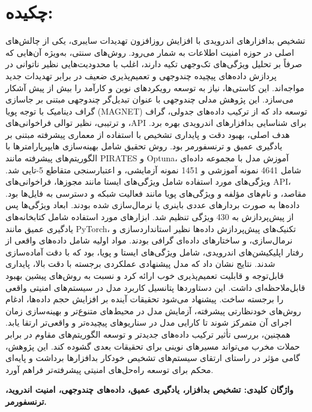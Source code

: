 \chapter*{\vspace{-2.38cm}\fontsize{15}{16}\selectfont چکیده:}
\vspace{-1.5cm}\setlength{\parindent}{20pt}
تشخیص بدافزارهای اندرویدی با افزایش روزافزون تهدیدات سایبری، یکی از چالش‌های اصلی در حوزه امنیت اطلاعات به شمار می‌رود. روش‌های سنتی، به‌ویژه آن‌هایی که صرفاً بر تحلیل ویژگی‌های تک‌وجهی تکیه دارند، اغلب با محدودیت‌هایی نظیر ناتوانی در پردازش داده‌های پیچیده چندوجهی و تعمیم‌پذیری ضعیف در برابر تهدیدات جدید مواجه‌اند. این کاستی‌ها، نیاز به توسعه رویکردهای نوین و کارآمد را بیش از پیش آشکار می‌سازد. این پژوهش مدلی چندوجهی با عنوان تبدیل‌گر چندوجهی مبتنی بر جاسازی گراف دینامیک با توجه پویا (MAGNET) توسعه داد که از ترکیب داده‌های جدولی، گراف و ترتیبی، نظیر توالی فراخوانی‌های ،API برای شناسایی بدافزارهای اندرویدی بهره برد. هدف اصلی، بهبود دقت و پایداری تشخیص با استفاده از معماری پیشرفته مبتنی بر یادگیری عمیق و ترنسفورمر بود. روش تحقیق شامل بهینه‌سازی هایپرپارامترها با الگوریتم‌های پیشرفته مانند PIRATES و Optuna، آموزش مدل با مجموعه داده‌ای شامل 4641 نمونه آموزشی و 1451 نمونه آزمایشی، و اعتبارسنجی متقاطع 5-تایی شد. ویژگی‌های مورد استفاده شامل ویژگی‌های ایستا مانند مجوزها، فراخوانی‌های API، مقاصد، و نام‌های مؤلفه و ویژگی‌های پویا مانند فعالیت شبکه و دسترسی به فایل‌ها بود. داده‌ها به صورت بردارهای عددی باینری یا نرمال‌سازی شده بودند. ابعاد ویژگی‌ها پس از پیش‌پردازش به 430 ویژگی تنظیم شد. ابزارهای مورد استفاده شامل کتابخانه‌های یادگیری عمیق مانند PyTorch، تکنیک‌های پیش‌پردازش داده‌ها نظیر استانداردسازی و نرمال‌سازی، و ساختارهای داده‌ای گرافی بودند. مواد اولیه شامل داده‌های واقعی از رفتار اپلیکیشن‌های اندرویدی، شامل ویژگی‌های ایستا و پویا، بود که با دقت آماده‌سازی شدند. نتایج نشان داد که مدل پیشنهادی عملکردی برجسته با دقت بالا، پایداری قابل‌توجه و قابلیت تعمیم‌پذیری خوب ارائه کرد و نسبت به روش‌های پیشین بهبود قابل‌ملاحظه‌ای داشت. این دستاوردها پتانسیل کاربرد مدل در سیستم‌های امنیتی واقعی را برجسته ساخت. پیشنهاد می‌شود تحقیقات آینده بر افزایش حجم داده‌ها، ادغام روش‌های خودنظارتی پیشرفته، آزمایش مدل در محیط‌های متنوع‌تر و بهینه‌سازی زمان اجرای آن متمرکز شوند تا کارایی مدل در سناریوهای پیچیده‌تر و واقعی‌تر ارتقا یابد. همچنین، بررسی تأثیر ترکیب داده‌های جدیدتر و توسعه الگوریتم‌های مقاوم در برابر حملات مخرب می‌تواند مسیرهای نوینی برای تحقیقات بعدی گشوده کند. این پژوهش، گامی مؤثر در راستای ارتقای سیستم‌های تشخیص خودکار بدافزارها برداشت و پایه‌ای محکم برای توسعه راه‌حل‌های امنیتی پیشرفته‌تر فراهم آورد.

\par\vspace{.5cm}\setlength{\parindent}{0pt}
{\bf
واژگان کلیدی: تشخیص بدافزار، یادگیری عمیق، داده‌های چندوجهی، امنیت اندروید، ترنسفورمر.

} 

 
